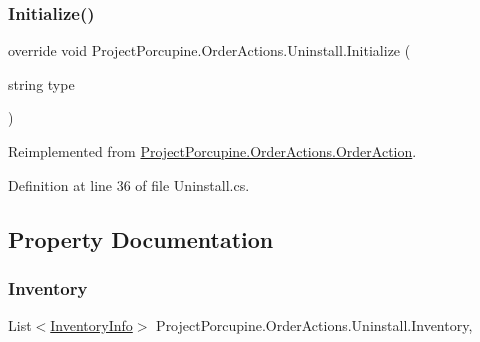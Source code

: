 \mbox{\label{class_project_porcupine_1_1_order_actions_1_1_uninstall_a870ae2bac8212aab9b722f294725db45}} 
\subsubsection{\texorpdfstring{Initialize()}{Initialize()}}
{\footnotesize\ttfamily override void Project\+Porcupine.\+Order\+Actions.\+Uninstall.\+Initialize (\begin{DoxyParamCaption}\item[{string}]{type }\end{DoxyParamCaption})\hspace{0.3cm}{\ttfamily [virtual]}}



Reimplemented from \hyperlink{class_project_porcupine_1_1_order_actions_1_1_order_action_afb48593caf6e46d965ac5182bcfe1c4b}{Project\+Porcupine.\+Order\+Actions.\+Order\+Action}.



Definition at line 36 of file Uninstall.\+cs.



\subsection{Property Documentation}
\mbox{\label{class_project_porcupine_1_1_order_actions_1_1_uninstall_a09b143dcff019e2e324189c304bb78fb}} 
\subsubsection{\texorpdfstring{Inventory}{Inventory}}
{\footnotesize\ttfamily List$<$\hyperlink{class_project_porcupine_1_1_order_actions_1_1_order_action_1_1_inventory_info}{Inventory\+Info}$>$ Project\+Porcupine.\+Order\+Actions.\+Uninstall.\+Inventory\hspace{0.3cm}{\ttfamily [get]}, {\ttfamily [set]}}



